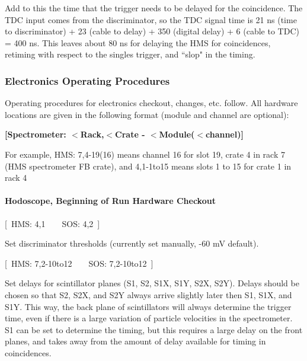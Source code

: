 Add to this the time that the trigger needs to be delayed for the
coincidence. The TDC input comes from the discriminator, so
the TDC signal time is 21 ns (time to discriminator) +
23 (cable to delay) + 350 (digital delay) + 6 (cable to TDC)
= 400 ns. This leaves about 80 ns for delaying the HMS for coincidences,
retiming with respect to the singles trigger, and ``slop" in the timing.

\subsubsection{Electronics Operating Procedures}

Operating procedures for electronics checkout, changes, etc. follow.
All hardware locations are given in the following format
(module and channel are optional):
\begin{description}
\item{\bf [Spectrometer:
$<$Rack,$<$Crate - $<$Module($<$channel)]}
\end{description}

For example, HMS: 7,4-19(16) means channel 16 for slot 19,
crate 4 in rack 7 (HMS spectrometer FB crate),
and 4,1-1to15 means slots 1 to 15 for crate 1 in rack 4

\paragraph{Hodoscope, Beginning of Run Hardware Checkout}

\begin{description}
\item{[~HMS: 4,1~~~~SOS: 4,2~]}
\end{description}

Set discriminator thresholds (currently set manually, -60 mV default).

\begin{description}
\item{[~HMS: 7,2-10to12~~~~SOS: 7,2-10to12~]}
\end{description}

Set delays for scintillator planes (S1, S2, S1X, S1Y, S2X, S2Y). Delays
should be chosen so that S2, S2X, and S2Y always arrive slightly later
then S1, S1X, and S1Y. This way, the back plane of scintillators will always
determine the trigger time, even if there is a large variation of particle
velocities in the spectrometer. S1 can be set to determine the timing, but
this requires a large delay on the front planes, and takes away from the
amount of delay available for timing in coincidences.

